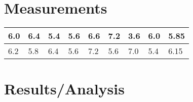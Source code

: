 \documentclass[12pt,titlepage,final]{article}
\begin{document}

\section{Measurements}

\begin{tabular}{| l | l | l | l | l | l | l | l || l |}
    \hline 
    6.0 & 6.4 & 5.4 & 5.6 & 6.6 & 7.2 & 3.6 & 6.0 &     5.85\\
    \hline
    6.2 & 5.8 & 6.4 & 5.6 & 7.2 & 5.6 & 7.0 & 5.4 &     6.15\\
    \hline

\end{tabular}

\section{Results/Analysis}
\end{document}
